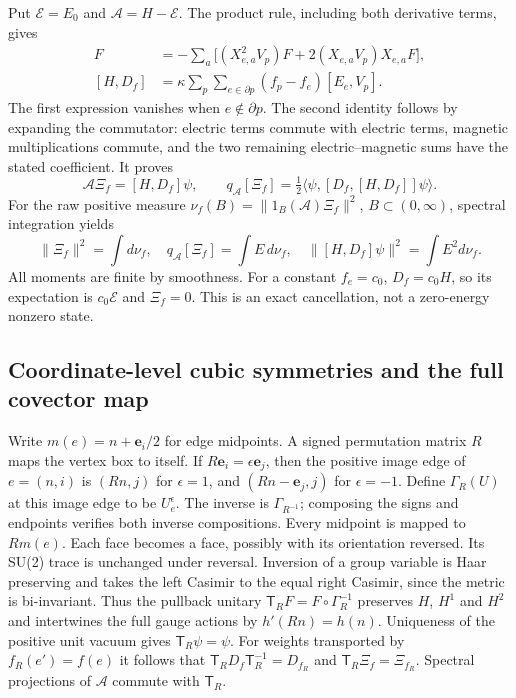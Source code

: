 \documentclass[11pt]{article}
\begin{document}
Put $\mathcal E=E_0$ and $\mathcal A=H-\mathcal E$.
The product rule, including both derivative terms, gives
\begin{align}
 [E_e,V_p]F&=-\sum_a\bigl[(X_{e,a}^2V_p)F+
                           2(X_{e,a}V_p)X_{e,a}F\bigr],\label{eq:fabel-local-comm}\\
 [H,D_f]&=\kappa\sum_p\sum_{e\in\partial p}(f_p-f_e)[E_e,V_p].
 \label{eq:fabel-current-full}
\end{align}
The first expression vanishes when $e\notin\partial p$.
The second identity follows by expanding the commutator: electric terms
commute with electric terms, magnetic multiplications commute, and the
two remaining electric--magnetic sums have the stated coefficient.
It proves
\[
 \mathcal A\Xi_f=[H,D_f]\psi,\qquad
 q_{\mathcal A}[\Xi_f]=\tfrac12
 \langle\psi,[D_f,[H,D_f]]\psi\rangle .
\]
For the raw positive measure
$\nu_f(B)=\|1_B(\mathcal A)\Xi_f\|^2$, $B\subset(0,\infty)$, spectral
integration yields
\begin{equation}\label{eq:fabel-three-moments}
 \|\Xi_f\|^2=\int d\nu_f,\quad
 q_{\mathcal A}[\Xi_f]=\int E\,d\nu_f,\quad
 \|[H,D_f]\psi\|^2=\int E^2d\nu_f .
\end{equation}
All moments are finite by smoothness. For a constant $f_e=c_0$,
$D_f=c_0H$, so its expectation is $c_0\mathcal E$ and $\Xi_f=0$.
This is an exact cancellation, not a zero-energy nonzero state.

\subsection{Coordinate-level cubic symmetries and the full covector map}
Write $m(e)=n+\mathbf e_i/2$ for edge midpoints. A signed permutation
matrix $R$ maps the vertex box to itself. If $R\mathbf e_i=\epsilon\mathbf e_j$,
then the positive image edge of $e=(n,i)$ is $(Rn,j)$ for $\epsilon=1$,
and $(Rn-\mathbf e_j,j)$ for $\epsilon=-1$.
Define $\Gamma_R(U)$ at this image edge to be $U_e^\epsilon$.
The inverse is $\Gamma_{R^{-1}}$; composing the signs and endpoints
verifies both inverse compositions. Every midpoint is mapped to $Rm(e)$.
Each face becomes a face, possibly with its orientation reversed.
Its SU(2) trace is unchanged under reversal.
Inversion of a group variable is Haar preserving and takes the
left Casimir to the equal right Casimir, since the metric is bi-invariant.
Thus the pullback unitary
$\mathsf T_RF=F\circ\Gamma_R^{-1}$ preserves $H$, $H^1$ and $H^2$ and
intertwines the full gauge actions by $h'(Rn)=h(n)$.
Uniqueness of the positive unit vacuum gives $\mathsf T_R\psi=\psi$.
For weights transported by $f_R(e')=f(e)$ it follows that
$\mathsf T_RD_f\mathsf T_R^{-1}=D_{f_R}$ and
$\mathsf T_R\Xi_f=\Xi_{f_R}$. Spectral projections of $\mathcal A$ commute
with $\mathsf T_R$.
\end{document}
